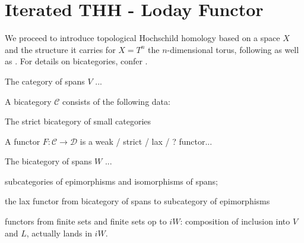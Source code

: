 \section{Iterated THH - Loday Functor}
  We proceed to introduce topological Hochschild homology based on a space $X$ and the structure it carries for $X = T^n$ the $n$-dimensional torus, following \cite{brun2010covering} as well as \cite{carlsson2011higher}. For details on bicategories, confer \cite{benabou1967introduction}.\\

  \begin{defn}\label{def_cateogry_of_spans}
    The category of spans $V$ ...
  \end{defn}

  \begin{defn}\label{def_bicategory}
    A bicategory $\mathcal{C}$ consists of the following data:
  \end{defn}

  \begin{ex}\label{ex_bicategory_of_categories}
    The strict bicategory of small categories
  \end{ex}

  \begin{defn}\label{def_bicategory_functor}
    A functor $F: \mathcal{C} \to \mathcal{D}$ is a weak / strict / lax / ? functor...
  \end{defn}

  \begin{defn}\label{def_bicategory_of_spans}
    The bicategory of spans $W$ ...
  \end{defn}

  \begin{defn}\label{def_subcategories_of_epimorphisms_and_isomorphisms}
    subcategories of epimorphisms and isomorphisms of spans;
  \end{defn}

  \begin{defn}\label{def_lax_functor_V_to_eW}
    the lax functor from bicategory of spans to subcategory of epimorphisms
  \end{defn}

  \begin{defn}\label{def_functors_finite_sets_to_iW}
    functors from finite sets and finite sets op to $iW$: composition of inclusion into $V$ and $L$, actually lands in $iW$.
  \end{defn}

